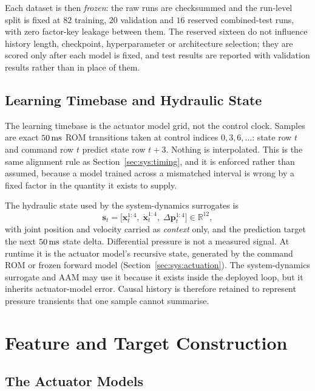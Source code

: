 Each dataset is then \emph{frozen}: the raw runs are checksummed and the
run-level split is fixed at $82$ training, $20$ validation and $16$ reserved
combined-test runs, with zero factor-key leakage between them. The reserved
sixteen do not influence history length, checkpoint, hyperparameter or
architecture selection; they are scored only after each model is fixed, and test
results are reported with validation results rather than in place of them.

\subsection{Learning Timebase and Hydraulic State}

The learning timebase is the actuator model grid, not the control clock.
Samples are exact $\unit[50]{ms}$ ROM transitions taken at control
indices $0, 3, 6, \dots$: state row $t$ and command row $t$ predict
state row $t+3$. Nothing is interpolated. This is the same alignment
rule as Section~\ref{sec:sys:timing}, and it is enforced rather than
assumed, because a model trained across a mismatched interval is wrong by a fixed factor in the quantity it exists to supply.

The hydraulic state used by the system-dynamics surrogates is
%
\begin{equation}
  \label{eq:data:sdstate}
  \bm{s}_t = \bigl[\bm{x}_t^{1:4},\; \dot{\bm{x}}_t^{1:4},\;
  \Delta\bm{p}_t^{1:4}\bigr] \in \mathbb{R}^{12},
\end{equation}
%
with joint position and velocity carried as \emph{context} only, and the
prediction target the next $\unit[50]{ms}$ state delta. Differential pressure
is not a measured signal. At runtime it is the actuator model's recursive
state, generated by the command ROM or frozen forward model
(Section~\ref{sec:sys:actuation}). The system-dynamics surrogate and AAM may use it
because it exists inside the deployed loop, but it inherits actuator-model
error. Causal history is therefore retained to represent pressure transients
that one sample cannot summarise.

\section{Feature and Target Construction}
\label{sec:data:features}

\subsection{The Actuator Models}

